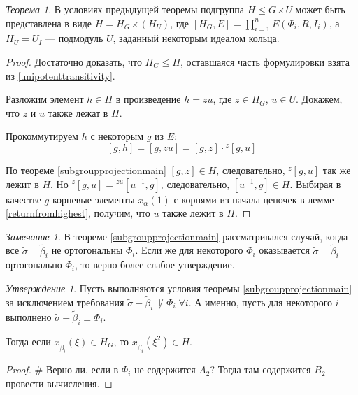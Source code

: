 \documentclass[10pt]{article}
\theoremstyle{remark}
\newtheorem{prop}{Утверждение}
\newtheorem{thm}{Теорема}
\newtheorem{rem}{Замечание}
\renewcommand{\le}{\leqslant}
\begin{document}
\begin{thm}
В условиях предыдущей теоремы подгруппа $H\le G \rightthreetimes U$ может быть представлена в виде $H = H_G \rightthreetimes (H_U)$, где $[H_G,E] = \prod_{i=1}^n E(\Phi_i, R, I_i)$, а $H_U=U_I$ --- подмодуль $U$, заданный некоторым идеалом кольца.
\end{thm}
\begin{proof}
Достаточно доказать, что $H_G \le H$, оставшаяся часть формулировки взята из \ref{unipotenttransitivity}.

Разложим элемент $h \in H$ в произведение $h = z u$, где $z \in H_G$, $u \in U$. Докажем, что $z$ и $u$ также лежат в $H$.

Прокоммутируем $h$ с некоторым $g$ из $E$:
$$ [g, h] = [g,zu] = [g,z] \cdot {}^z[g,u] $$

По теореме \ref{subgroupprojectionmain} $[g,z]\in H$, следовательно, ${}^z[g,u]$ так же лежит в $H$. Но
$ {}^z[g,u] = {}^{zu}[u^{-1},g] $, следовательно, $[u^{-1},g] \in H$. Выбирая в качестве $g$ корневые элементы $x_\alpha(1)$ с корнями из начала цепочек в лемме \ref{returnfromhighest}, получим, что $u$ также лежит в $H$.
\end{proof}

\begin{rem}
В теореме \ref{subgroupprojectionmain} рассматривался случай, когда все $\widetilde\sigma-\widetilde\beta_i$ не ортогональны $\Phi_i$. Если же для некоторого $\Phi_i$ оказывается $\widetilde\sigma-\widetilde\beta_i$ ортогонально $\Phi_i$, то верно более слабое утверждение.
\end{rem}

\begin{prop}
Пусть выполняются условия теоремы \ref{subgroupprojectionmain} за исключением требования $\widetilde\sigma-\widetilde\beta_i \not\perp \Phi_i \; \forall i$. А именно, пусть для некоторого $i$ выполнено $\widetilde\sigma-\widetilde\beta_i \perp \Phi_i$.

Тогда если $x_{\widetilde\beta_i}(\xi) \in H_G$, то $x_{\widetilde\beta_i}(\xi^2) \in H$.
\end{prop}
\begin{proof}
\# Верно ли, если в $\Phi_i$ не содержится $A_2$? Тогда там содержится $B_2$ --- провести вычисления.
\end{proof}




\end{document}
